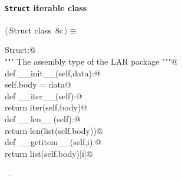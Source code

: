 \documentclass[11pt,oneside]{article}	%
\begin{document}
\paragraph{\texttt{Struct} iterable class}
\begin{flushleft} \small \label{scrap25}
\protect{}$\langle\,$Struct class\nobreak\ {\footnotesize 8c}$\,\rangle\equiv$
\vspace{-1ex}
\begin{list}{}{} \item
\mbox{}\verb@class Struct:@\\
\mbox{}\verb@    """ The assembly type of the LAR package """@\\
\mbox{}\verb@    def __init__(self,data):@\\
\mbox{}\verb@        self.body = data@\\
\mbox{}\verb@    def __iter__(self):@\\
\mbox{}\verb@        return iter(self.body)@\\
\mbox{}\verb@    def __len__(self):@\\
\mbox{}\verb@        return len(list(self.body))@\\
\mbox{}\verb@    def __getitem__(self,i):@\\
\mbox{}\verb@        return list(self.body)[i]@\\
\mbox{}\verb@@{\NWsep}
\end{list}
\vspace{-1ex}
\footnotesize\addtolength{\baselineskip}{-1ex}
\begin{list}{}{\setlength{\itemsep}{-\parsep}\setlength{\itemindent}{-\leftmargin}}
\item \NWtxtMacroRefIn\ .
\end{list}
\end{flushleft}
\end{document}

